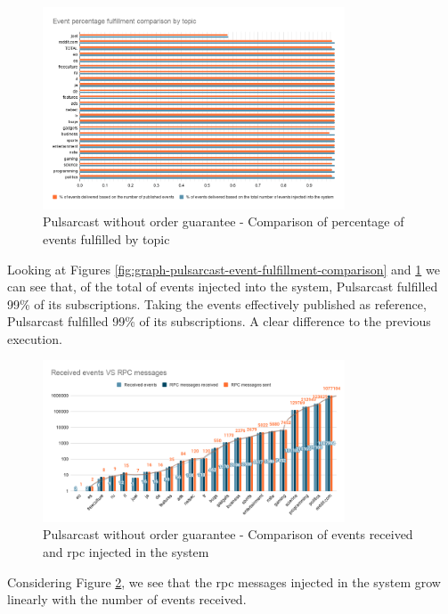 \begin{figure}[!htb]
  \centering
  \includegraphics[width=0.8\textwidth]{img/graph-pulsarcast-event-percentage-fulfillment-comparison.png}
  \caption{Pulsarcast without order guarantee - Comparison of percentage of events fulfilled by topic}
  \label{fig:graph-pulsarcast-event-percentage-fulfillment-comparison}
\end{figure}

Looking at Figures \ref{fig:graph-pulsarcast-event-fulfillment-comparison} and
\ref{fig:graph-pulsarcast-event-percentage-fulfillment-comparison} we can see
that, of the total of events injected into the system, Pulsarcast fulfilled
99\% of its subscriptions. Taking the events effectively published as
reference, Pulsarcast fulfilled 99\% of its subscriptions. A clear difference
to the previous execution.

\begin{figure}[!htb]
  \centering
  \includegraphics[width=0.8\textwidth]{img/graph-pulsarcast-rpc.png}
  \caption{Pulsarcast without order guarantee - Comparison of events received and \acrshort{rpc} injected in the system}
  \label{fig:graph-pulsarcast-rpc}
\end{figure}

Considering Figure \ref{fig:graph-pulsarcast-rpc}, we see that the \acrshort{rpc} messages
injected in the system grow linearly with the number of events received.

